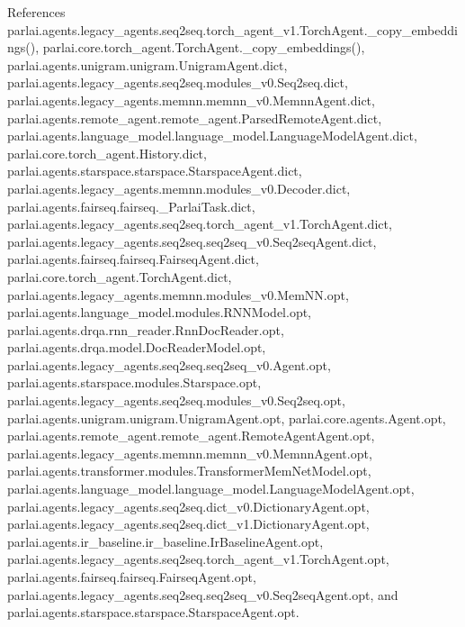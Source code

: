 References parlai.\+agents.\+legacy\+\_\+agents.\+seq2seq.\+torch\+\_\+agent\+\_\+v1.\+Torch\+Agent.\+\_\+copy\+\_\+embeddings(), parlai.\+core.\+torch\+\_\+agent.\+Torch\+Agent.\+\_\+copy\+\_\+embeddings(), parlai.\+agents.\+unigram.\+unigram.\+Unigram\+Agent.\+dict, parlai.\+agents.\+legacy\+\_\+agents.\+seq2seq.\+modules\+\_\+v0.\+Seq2seq.\+dict, parlai.\+agents.\+legacy\+\_\+agents.\+memnn.\+memnn\+\_\+v0.\+Memnn\+Agent.\+dict, parlai.\+agents.\+remote\+\_\+agent.\+remote\+\_\+agent.\+Parsed\+Remote\+Agent.\+dict, parlai.\+agents.\+language\+\_\+model.\+language\+\_\+model.\+Language\+Model\+Agent.\+dict, parlai.\+core.\+torch\+\_\+agent.\+History.\+dict, parlai.\+agents.\+starspace.\+starspace.\+Starspace\+Agent.\+dict, parlai.\+agents.\+legacy\+\_\+agents.\+memnn.\+modules\+\_\+v0.\+Decoder.\+dict, parlai.\+agents.\+fairseq.\+fairseq.\+\_\+\+Parlai\+Task.\+dict, parlai.\+agents.\+legacy\+\_\+agents.\+seq2seq.\+torch\+\_\+agent\+\_\+v1.\+Torch\+Agent.\+dict, parlai.\+agents.\+legacy\+\_\+agents.\+seq2seq.\+seq2seq\+\_\+v0.\+Seq2seq\+Agent.\+dict, parlai.\+agents.\+fairseq.\+fairseq.\+Fairseq\+Agent.\+dict, parlai.\+core.\+torch\+\_\+agent.\+Torch\+Agent.\+dict, parlai.\+agents.\+legacy\+\_\+agents.\+memnn.\+modules\+\_\+v0.\+Mem\+N\+N.\+opt, parlai.\+agents.\+language\+\_\+model.\+modules.\+R\+N\+N\+Model.\+opt, parlai.\+agents.\+drqa.\+rnn\+\_\+reader.\+Rnn\+Doc\+Reader.\+opt, parlai.\+agents.\+drqa.\+model.\+Doc\+Reader\+Model.\+opt, parlai.\+agents.\+legacy\+\_\+agents.\+seq2seq.\+seq2seq\+\_\+v0.\+Agent.\+opt, parlai.\+agents.\+starspace.\+modules.\+Starspace.\+opt, parlai.\+agents.\+legacy\+\_\+agents.\+seq2seq.\+modules\+\_\+v0.\+Seq2seq.\+opt, parlai.\+agents.\+unigram.\+unigram.\+Unigram\+Agent.\+opt, parlai.\+core.\+agents.\+Agent.\+opt, parlai.\+agents.\+remote\+\_\+agent.\+remote\+\_\+agent.\+Remote\+Agent\+Agent.\+opt, parlai.\+agents.\+legacy\+\_\+agents.\+memnn.\+memnn\+\_\+v0.\+Memnn\+Agent.\+opt, parlai.\+agents.\+transformer.\+modules.\+Transformer\+Mem\+Net\+Model.\+opt, parlai.\+agents.\+language\+\_\+model.\+language\+\_\+model.\+Language\+Model\+Agent.\+opt, parlai.\+agents.\+legacy\+\_\+agents.\+seq2seq.\+dict\+\_\+v0.\+Dictionary\+Agent.\+opt, parlai.\+agents.\+legacy\+\_\+agents.\+seq2seq.\+dict\+\_\+v1.\+Dictionary\+Agent.\+opt, parlai.\+agents.\+ir\+\_\+baseline.\+ir\+\_\+baseline.\+Ir\+Baseline\+Agent.\+opt, parlai.\+agents.\+legacy\+\_\+agents.\+seq2seq.\+torch\+\_\+agent\+\_\+v1.\+Torch\+Agent.\+opt, parlai.\+agents.\+fairseq.\+fairseq.\+Fairseq\+Agent.\+opt, parlai.\+agents.\+legacy\+\_\+agents.\+seq2seq.\+seq2seq\+\_\+v0.\+Seq2seq\+Agent.\+opt, and parlai.\+agents.\+starspace.\+starspace.\+Starspace\+Agent.\+opt.

